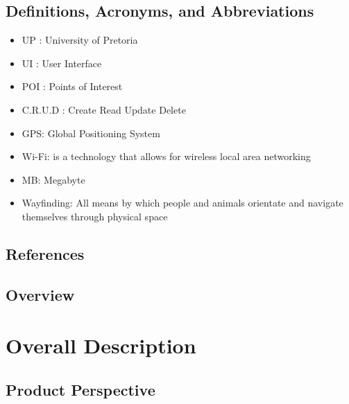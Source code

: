 \documentclass{article}
\begin{document}
        \subsection{Definitions, Acronyms, and Abbreviations}
	\begin{itemize}
  				\item UP : University of Pretoria
				\item UI : User Interface
				\item POI : Points of Interest
				\item C.R.U.D : Create Read Update Delete
				\item GPS: Global Positioning System
				\item Wi-Fi: is a technology that allows for wireless local area networking
				\item MB: Megabyte
				\item Wayfinding: All means by which people and animals orientate and navigate themselves through physical space
			\end{itemize}
        \subsection{References}
        \subsection{Overview}
	
	\section{Overall Description}
		
        \subsection{Product Perspective}
        
\end{document}
